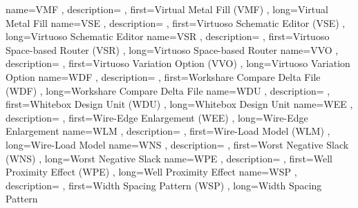 { name={VMF}
, description={}
, first={Virtual Metal Fill (VMF)}
, long={Virtual Metal Fill}
}
{ name={VSE}
, description={}
, first={Virtuoso Schematic Editor (VSE)}
, long={Virtuoso Schematic Editor}
}
{ name={VSR}
, description={}
, first={Virtuoso Space-based Router (VSR)}
, long={Virtuoso Space-based Router}
}
{ name={VVO}
, description={}
, first={Virtuoso Variation Option (VVO)}
, long={Virtuoso Variation Option}
}
{ name={WDF}
, description={}
, first={Workshare Compare Delta File (WDF)}
, long={Workshare Compare Delta File}
}
{ name={WDU}
, description={}
, first={Whitebox Design Unit (WDU)}
, long={Whitebox Design Unit}
}
{ name={WEE}
, description={}
, first={Wire-Edge Enlargement (WEE)}
, long={Wire-Edge Enlargement}
}
{ name={WLM}
, description={}
, first={Wire-Load Model (WLM)}
, long={Wire-Load Model}
}
{ name={WNS}
, description={}
, first={Worst Negative Slack (WNS)}
, long={Worst Negative Slack}
}
{ name={WPE}
, description={}
, first={Well Proximity Effect (WPE)}
, long={Well Proximity Effect}
}
{ name={WSP}
, description={}
, first={Width Spacing Pattern (WSP)}
, long={Width Spacing Pattern}
}
